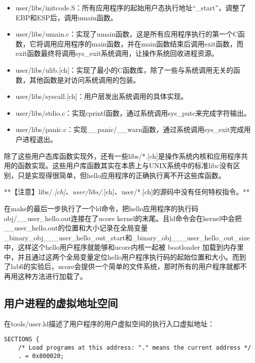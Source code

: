 \begin{itemize}
\tightlist
\item
  user/libs/initcode.S：所有应用程序的起始用户态执行地址``\_start''，调整了EBP和ESP后，调用umain函数。
\item
  user/libs/umain.c：实现了umain函数，这是所有应用程序执行的第一个C函数，它将调用应用程序的main函数，并在main函数结束后调用exit函数，而exit函数最终将调用sys\_exit系统调用，让操作系统回收进程资源。
\item
  user/libs/ulib.{[}ch{]}：实现了最小的C函数库，除了一些与系统调用无关的函数，其他函数是对访问系统调用的包装。
\item
  user/libs/syscall.{[}ch{]}：用户层发出系统调用的具体实现。
\item
  user/libs/stdio.c：实现cprintf函数，通过系统调用sys\_putc来完成字符输出。
\item
  user/libs/panic.c：实现\_\_panic/\_\_warn函数，通过系统调用sys\_exit完成用户进程退出。
\end{itemize}

除了这些用户态库函数实现外，还有一些libs/*.{[}ch{]}是操作系统内核和应用程序共用的函数实现。这些用户库函数其实在本质上与UNIX系统中的标准libc没有区别，只是实现得很简单，但hello应用程序的正确执行离不开这些库函数。

**【注意】libs/\emph{.{[}ch{]}、user/libs/}.{[}ch{]}、user/*.{[}ch{]}的源码中没有任何特权指令。**

在make的最后一步执行了一个ld命令，把hello应用程序的执行码obj/\_\_user\_hello.out连接在了ucore
kernel的末尾。且ld命令会在kernel中会把\_\_user\_hello.out的位置和大小记录在全局变量\_binary\_obj\_\_\_user\_hello\_out\_start和\_binary\_obj\_\_\_user\_hello\_out\_size中，这样这个hello用户程序就能够和ucore内核一起被
bootloader
加载到内存里中，并且通过这两个全局变量定位hello用户程序执行码的起始位置和大小。而到了lab6的实验后，ucore会提供一个简单的文件系统，那时所有的用户程序就都不再用这种方法进行加载了。

\subsection{用户进程的虚拟地址空间}\label{ux7528ux6237ux8fdbux7a0bux7684ux865aux62dfux5730ux5740ux7a7aux95f4}

在tools/user.ld描述了用户程序的用户虚拟空间的执行入口虚拟地址：

\begin{lstlisting}
SECTIONS {
    /* Load programs at this address: "." means the current address */
    . = 0x800020;
\end{lstlisting}

